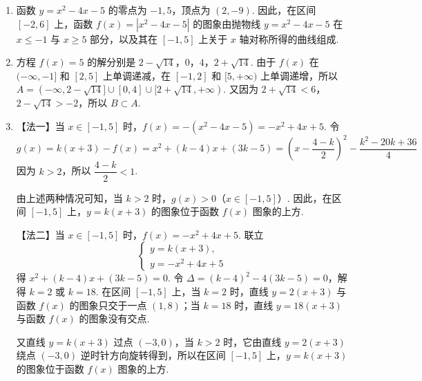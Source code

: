 \begin{solution}
\begin{enumerate}
\item 函数 \(y=x^2-4x-5\) 的零点为 \(-1,5\)，顶点为 \((2,-9)\). 因此，在区间 \([-2,6]\) 上，函数 \(f(x)=|x^2-4x-5|\) 的图象由抛物线 \(y=x^2-4x-5\) 在 \(x\le-1\) 与 \(x\ge5\) 部分，以及其在 \([-1,5]\) 上关于 \(x\) 轴对称所得的曲线组成.
\end{enumerate}

\FloatBarrier

\begin{enumerate}
\setcounter{enumi}{1}
\item 方程 \(f(x)=5\) 的解分别是 \(2-\sqrt{14}\)，\(0\)，\(4\)，\(2+\sqrt{14}\). 由于 \(f(x)\) 在 \((-\infty,-1]\) 和 \([2,5]\) 上单调递减，在 \([-1,2]\) 和 \([5,+\infty)\) 上单调递增，所以 \(A=(-\infty,2-\sqrt{14}]\cup[0,4]\cup[2+\sqrt{14},+\infty)\).
又因为 \(2+\sqrt{14}<6\)，\(2-\sqrt{14}>-2\)，所以 \(B\subset A\).

\item 【法一】当 \(x\in[-1,5]\) 时，\(f(x)=-(x^2-4x-5)=-x^2+4x+5\). 令
\[
g(x)=k(x+3)-f(x)=x^2+(k-4)x+(3k-5)=\left(x-\dfrac{4-k}{2}\right)^2-\dfrac{k^2-20k+36}{4}
\]
因为 \(k>2\)，所以 \(\dfrac{4-k}{2}<1\).


由上述两种情况可知，当 \(k>2\) 时，\(g(x)>0\)（\(x\in[-1,5]\)）. 因此，在区间 \([-1,5]\) 上，\(y=k(x+3)\) 的图象位于函数 \(f(x)\) 图象的上方.

【法二】当 \(x\in[-1,5]\) 时，\(f(x)=-x^2+4x+5\). 联立
\[
\begin{cases}
y=k(x+3),\\
y=-x^2+4x+5
\end{cases}
\]
得 \(x^2+(k-4)x+(3k-5)=0\). 令 \(\Delta=(k-4)^2-4(3k-5)=0\)，解得 \(k=2\) 或 \(k=18\). 在区间 \([-1,5]\) 上，当 \(k=2\) 时，直线 \(y=2(x+3)\) 与函数 \(f(x)\) 的图象只交于一点 \((1,8)\)；当 \(k=18\) 时，直线 \(y=18(x+3)\) 与函数 \(f(x)\) 的图象没有交点.

又直线 \(y=k(x+3)\) 过点 \((-3,0)\)，当 \(k>2\) 时，它由直线 \(y=2(x+3)\) 绕点 \((-3,0)\) 逆时针方向旋转得到，所以在区间 \([-1,5]\) 上，\(y=k(x+3)\) 的图象位于函数 \(f(x)\) 图象的上方.
\end{enumerate}
\end{solution}

